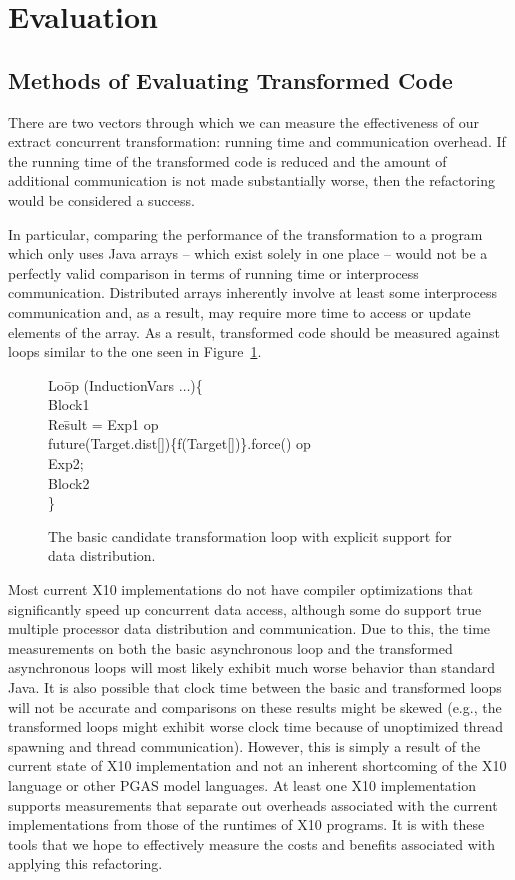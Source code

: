 \section{Evaluation}

\subsection{Methods of Evaluating Transformed Code}

There are two vectors through which we can measure the effectiveness
of our extract concurrent transformation: running time and communication
overhead. If the running time of the transformed code is reduced and the amount
of additional communication is not made substantially worse, then the
refactoring would be considered a success.

In particular, comparing the performance of the transformation to a
program which only uses Java arrays -- which exist solely in one place
-- would not be a perfectly valid comparison in terms of running time
or interprocess communication. Distributed arrays inherently involve
at least some interprocess communication and, as a result, may require
more time to access or update elements of the array. As a result,
transformed code should be measured against loops similar to the one
seen in Figure~\ref{fig:async_loop}.

\begin{figure}
  \begin{code}
    Lo\=op (InductionVars $\ldots$)\{ \\
    \>  Block1 \\
    \>  Re\=sult = Exp1 op \\
    \>\> future(Target.dist[])\{f(Target[])\}.force() op\\
    \>\> Exp2; \\
    \>  Block2 \\
    \}
  \end{code}
\caption{\label{fig:async_loop} The basic candidate transformation
loop with explicit support for data distribution.}
\end{figure}

Most current X10 implementations do not have compiler optimizations that
significantly speed up concurrent data access, although some do support true
multiple processor data distribution and communication. Due to this, the time
measurements on both the basic asynchronous loop and the transformed
asynchronous loops will most likely exhibit much worse behavior than standard
Java. It is also possible that clock time between the basic and transformed
loops will not be accurate and comparisons on these results might be skewed
(e.g., the transformed loops might exhibit worse clock time because of
unoptimized thread spawning and thread communication). However, this is
simply a result of the current state of X10 implementation and not an
inherent shortcoming of the X10 language or other PGAS model
languages. At least one X10 implementation supports measurements that
separate out overheads associated with the current implementations from
those of the runtimes of X10 programs. It is with these tools that we hope
to effectively measure the costs and benefits associated with applying this
refactoring.

